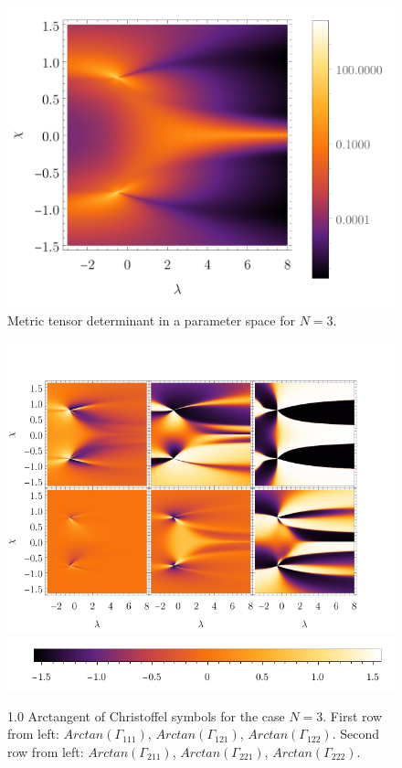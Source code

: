 \begin{figure}[H]
    \centering
    \includegraphics[scale=1.3]{../img/N=3_gDivergence.pdf}
    \caption{Metric tensor determinant in a parameter space for $N=3$.}
    \label{fig:N=3_gDivenrgence}    
\end{figure}

\vspace{-40pt}
\begin{figure}[H]
    \centering
    \includegraphics[scale=1.3]{../img/N=3_gammas.pdf}    
    \includegraphics[scale=1.3]{../img/N=3_barA.pdf}
    \caption{1.0 Arctangent of Christoffel symbols for the case $N=3$. First row from left: $Arctan(\Gamma_{111})$, $Arctan(\Gamma_{121})$, $Arctan(\Gamma_{122})$. Second row from left: $Arctan(\Gamma_{211})$, $Arctan(\Gamma_{221})$, $Arctan(\Gamma_{222})$.}
    \label{fig:N=3_G}
\end{figure}

